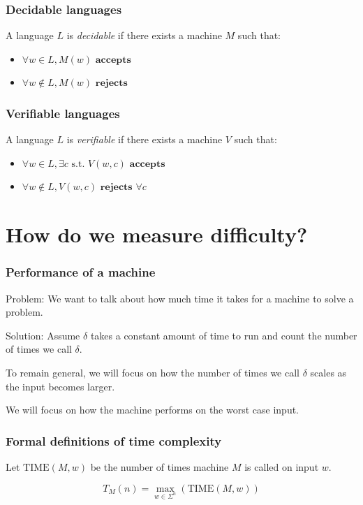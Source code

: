 \documentclass[aspectratio=169]{beamer}
\begin{document}
\begin{frame}
\frametitle{Decidable languages}
A language $L$ is {\em decidable} if there exists a machine $M$ such that:

\begin{itemize}
	\item $\forall w \in L, M(w) \textbf{ accepts}$
	\item $\forall w \notin L, M(w) \textbf{ rejects}$
\end{itemize}
\end{frame}

\begin{frame}
\frametitle{Verifiable languages}
A language $L$ is {\em verifiable} if there exists a machine $V$ such that:

\begin{itemize}
	\item $\forall w \in L, \exists c \text{ s.t. } V(w, c) \textbf{ accepts}$
	\item $\forall w \notin L, V(w, c) \textbf{ rejects } \forall c$
\end{itemize}
\end{frame}

\section{How do we measure difficulty?}

\begin{frame}
\frametitle{Performance of a machine}
Problem: We want to talk about how much time it takes for a machine to solve a problem.

Solution: Assume $\delta$ takes a constant amount of time to run and count the number of times we call $\delta$.

To remain general, we will focus on how the number of times we call $\delta$ scales as the input becomes larger.

We will focus on how the machine performs on the worst case input.
\end{frame}

\begin{frame}
\frametitle{Formal definitions of time complexity}
Let $\mathrm{TIME}(M, w)$ be the number of times machine $M$ is called on input $w$.

\[T_M(n) = \max_{w \in \Sigma^n}(\mathrm{TIME}(M, w))\]
\end{frame}
\end{document}
